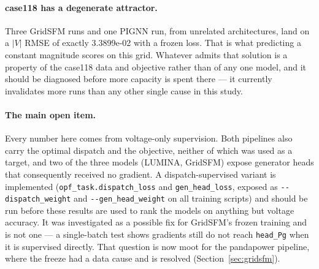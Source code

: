 \documentclass[10pt]{article}
\begin{document}
\paragraph{case118 has a degenerate attractor.} Three GridSFM runs and one
PIGNN run, from unrelated architectures, land on a \(|V|\) RMSE of exactly
3.3899e-02 with a frozen loss. That is what predicting a constant magnitude
scores on this grid. Whatever admits that solution is a property of the case118
data and objective rather than of any one model, and it should be diagnosed
before more capacity is spent there --- it currently invalidates more runs than
any other single cause in this study.

\paragraph{The main open item.} Every number here comes from voltage-only
supervision. Both pipelines also carry the optimal dispatch and the objective,
neither of which was used as a target, and two of the three models (LUMINA,
GridSFM) expose generator heads that consequently received no gradient. A
dispatch-supervised variant is implemented (\texttt{opf\_task.dispatch\_loss}
and \texttt{gen\_head\_loss}, exposed as \texttt{-{}-dispatch\_weight} and
\texttt{-{}-gen\_head\_weight} on all training scripts) and should be run before
these results are used to rank the models on anything but voltage accuracy. It
was investigated as a possible fix for GridSFM's frozen training and is not one
--- a single-batch test shows gradients still do not reach \texttt{head\_Pg} when
it is supervised directly. That question is now moot for the pandapower pipeline,
where the freeze had a data cause and is resolved (Section~\ref{sec:gridsfm}).
\end{document}

